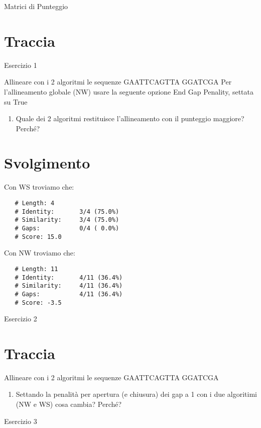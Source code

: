 \documentclass{article}
\begin{document}
\begin{center}
   \Huge
   Matrici di Punteggio
\end{center}
\section*{Traccia}
\begin{center}
   \huge
   Esercizio 1
\end{center}

Allineare con i 2 algoritmi le sequenze
GAATTCAGTTA
GGATCGA
Per l'allineamento globale (NW) usare la seguente opzione End Gap Penality, settata su True
\begin{enumerate}
   \item Quale dei 2 algoritmi restituisce l'allineamento con il punteggio maggiore? Perché?
\end{enumerate}
\section*{Svolgimento}
Con WS troviamo che:
\begin{verbatim}
   # Length: 4
   # Identity:       3/4 (75.0%)
   # Similarity:     3/4 (75.0%)
   # Gaps:           0/4 ( 0.0%)
   # Score: 15.0
\end{verbatim}
Con NW troviamo che: 
\begin{verbatim}
   # Length: 11
   # Identity:       4/11 (36.4%)
   # Similarity:     4/11 (36.4%)
   # Gaps:           4/11 (36.4%)
   # Score: -3.5
\end{verbatim}

\begin{center}
   \huge
   Esercizio 2
\end{center}
\section*{Traccia}
Allineare con i 2 algoritmi le sequenze
GAATTCAGTTA
GGATCGA
\begin{enumerate}
   \item Settando la penalità per apertura (e chiusura) dei gap a 1 con i due algoritimi (NW e WS) cosa cambia? Perché?
\end{enumerate}

\begin{center}
   \huge
   Esercizio 3
\end{center}
\end{document}
